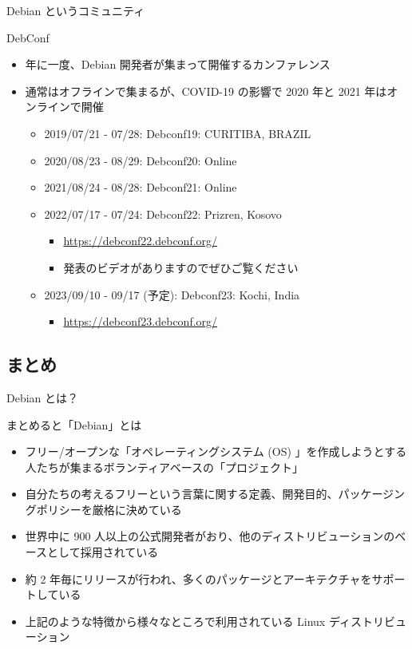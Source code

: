 \begin{frame}{Debian というコミュニティ}%

DebConf
  
\begin{itemize}
\item 年に一度、Debian 開発者が集まって開催するカンファレンス
\item 通常はオフラインで集まるが、COVID-19 の影響で 2020 年と 2021 年はオンラインで開催
  \begin{itemize}
  \item 2019/07/21 - 07/28: Debconf19: CURITIBA, BRAZIL
  \item 2020/08/23 - 08/29: Debconf20: Online
  \item 2021/08/24 - 08/28: Debconf21: Online
  \item 2022/07/17 - 07/24: Debconf22: Prizren, Kosovo
    \begin{itemize}
    \item \url{https://debconf22.debconf.org/}
    \item 発表のビデオがありますのでぜひご覧ください
    \end{itemize}
  \item 2023/09/10 - 09/17 (予定): Debconf23: Kochi, India
    \begin{itemize}
    \item \url{https://debconf23.debconf.org/}
    \end{itemize}
  \end{itemize}
\end{itemize}


\end{frame}

\subsection{まとめ}

\begin{frame}{Debian とは？}
  
まとめると「Debian」とは

\begin{itemize}
  \item フリー/オープンな「オペレーティングシステム (OS) 」を作成しようとする人たちが集まるボランティアベースの「プロジェクト」
  \item 自分たちの考えるフリーという言葉に関する定義、開発目的、パッケージングポリシーを厳格に決めている
  \item 世界中に 900 人以上の公式開発者がおり、他のディストリビューションのベースとして採用されている
  \item 約 2 年毎にリリースが行われ、多くのパッケージとアーキテクチャをサポートしている
  \item 上記のような特徴から様々なところで利用されている Linux ディストリビューション
\end{itemize}

\end{frame}

